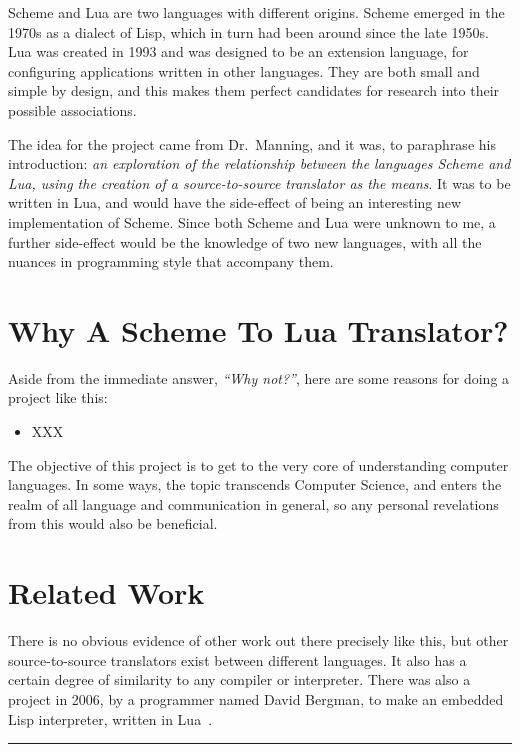 Scheme and Lua are two languages with different origins. Scheme emerged in the
1970s as a dialect of Lisp, which in turn had been around since the late 1950s.
Lua was created in 1993 and was designed to be an extension language, for
configuring applications written in other languages. They are both small and
simple by design, and this makes them perfect candidates for research into their
possible associations.

The idea for the project came from Dr.\ Manning, and it was, to paraphrase his
introduction: {\em an exploration of the relationship between the languages
Scheme and Lua, using the creation of a source-to-source translator as the
means}. It was to be written in Lua, and would have the side-effect of being an
interesting new implementation of Scheme. Since both Scheme and Lua were unknown
to me, a further side-effect would be the knowledge of two new languages, with
all the nuances in programming style that accompany them.


\section{Why A Scheme To Lua Translator?}

Aside from the immediate answer, \emph{``Why not?''}, here are some reasons for
doing a project like this:
\begin{itemize}
\item XXX
\end{itemize}
The objective of this project is to get to the very core of understanding
computer languages. In some ways, the topic transcends Computer Science, and
enters the realm of all language and communication in general, so any
personal revelations from this would also be beneficial.

\section{Related Work}

There is no obvious evidence of other work out there precisely like this, but
other source-to-source translators exist between different languages. It also
has a certain degree of similarity to any compiler or interpreter. There was
also a project in 2006, by a programmer named David Bergman, to make an embedded
Lisp interpreter, written in Lua~\cite{lualisp}. \\[5mm]

\hrule \hfill \\[5mm]

